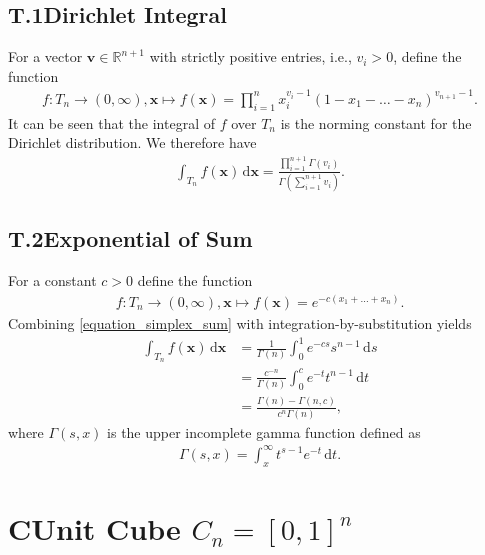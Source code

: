 \documentclass[11pt]{article}
\def\R{\mathbb{R}}
\def\bfv{\bm{v}}
\def\d{\,\mathrm{d}}
\def\bx{\mathbf{x}}
\begin{document}
\subsection*{T.1\hspace{0.5cm}Dirichlet Integral}
For a vector $\bfv\in\R^{n+1}$ with strictly positive entries, i.e., $v_i>0$, define the function
\begin{align*}
f\colon T_{n}\to(0,\infty), \bx \mapsto f(\bx) = \prod_{i=1}^{n}x_i^{v_i-1}(1 - x_1 - \ldots - x_n)^{v_{n+1}-1}.
\end{align*}
It can be seen that the integral of $f$ over $T_n$ is the norming constant for the Dirichlet distribution.
We therefore have
\begin{align*}
\int_{T_n} f(\bx) \d\bx = \frac{\prod_{i=1}^{n+1}\Gamma(v_i)}{\Gamma(\sum_{i=1}^{n+1}v_i)}.
\end{align*}
%
%
\subsection*{T.2\hspace{0.5cm}Exponential of Sum}
For a constant $c>0$ define the function
\begin{align*}
f\colon T_{n}\to(0,\infty), \bx \mapsto f(\bx) = e^{-c(x_1+\ldots+x_n)}.
\end{align*}
Combining \eqref{equation_simplex_sum} with integration-by-substitution yields
\begin{align*}
\int_{T_n} f(\bx) \d\bx
&= \frac{1}{\Gamma(n)} \int_0^1 e^{-cs}s^{n-1} \d s\\
&= \frac{c^{-n}}{\Gamma(n)} \int_0^c e^{-t}t^{n-1} \d t\\
&= \frac{\Gamma(n)-\Gamma(n,c)}{c^{n}\Gamma(n)},
\end{align*}
where $\Gamma(s,x)$ is the upper incomplete gamma function defined as
\begin{align*}
\Gamma(s,x) = \int_x^{\infty} t^{s-1}e^{-t} \d t.
\end{align*}
%
%
%
%
%
%
\section*{C\hspace{0.5cm}Unit Cube $C_n = [0,1]^n$}
\end{document}
